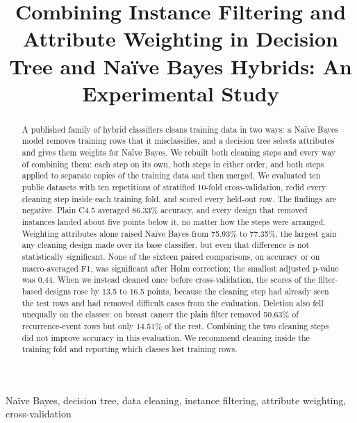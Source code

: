 \documentclass[conference]{IEEEtran}
\begin{document}
\title{Combining Instance Filtering and Attribute Weighting in Decision Tree and Na\"ive Bayes Hybrids: An Experimental Study}
\author{
\and
{}
}


\maketitle
\begin{abstract}
A published family of hybrid classifiers cleans training data in two ways: a
Na\"ive Bayes model removes training rows that it misclassifies, and a decision
tree selects attributes and gives them weights for Na\"ive Bayes. We rebuilt
both cleaning steps and every way of combining them: each step on its own, both
steps in either order, and both steps applied to separate copies of the training
data and then merged. We evaluated ten public datasets with ten repetitions of
stratified 10-fold cross-validation, redid every cleaning step inside each
training fold, and scored every held-out row. The findings are negative. Plain
C4.5 averaged 86.33\% accuracy, and every design that removed instances landed
about five points below it, no matter how the steps were arranged. Weighting
attributes alone raised Na\"ive Bayes from 75.93\% to 77.35\%, the largest gain
any cleaning design made over its base classifier, but even that difference is
not statistically significant. None of the sixteen paired comparisons, on
accuracy or on macro-averaged F1, was significant after Holm correction; the
smallest adjusted p-value was 0.44. When we instead cleaned once before
cross-validation, the scores of the filter-based designs rose by 13.5 to 16.5
points, because the cleaning step had already seen the test rows and had removed
difficult cases from the evaluation. Deletion also fell unequally on the
classes: on breast cancer the plain filter removed 50.63\% of recurrence-event
rows but only 14.51\% of the rest. Combining the two cleaning steps did not
improve accuracy in this evaluation. We recommend cleaning inside the training
fold and reporting which classes lost training rows.
\end{abstract}
\begin{IEEEkeywords}
Na\"ive Bayes, decision tree, data cleaning, instance filtering, attribute
weighting, cross-validation
\end{IEEEkeywords}
\end{document}
